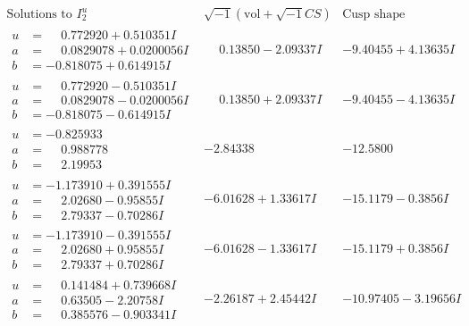 \documentclass[1p]{elsarticle_modified}
\theoremstyle{definition}
\newcommand{\I}{\sqrt{-1}}
\begin{document}
$$\begin{array}{c|c|c}  
\text{Solutions to }I^u_{2}& \I (\text{vol} + \sqrt{-1}CS) & \text{Cusp shape}\\
 \hline 
\begin{aligned}
u &= \phantom{-}0.772920 + 0.510351 I \\
a &= \phantom{-}0.0829078 + 0.0200056 I \\
b &= -0.818075 + 0.614915 I\end{aligned}
 & \phantom{-}0.13850 - 2.09337 I & -9.40455 + 4.13635 I \\ \hline\begin{aligned}
u &= \phantom{-}0.772920 - 0.510351 I \\
a &= \phantom{-}0.0829078 - 0.0200056 I \\
b &= -0.818075 - 0.614915 I\end{aligned}
 & \phantom{-}0.13850 + 2.09337 I & -9.40455 - 4.13635 I \\ \hline\begin{aligned}
u &= -0.825933\phantom{ +0.000000I} \\
a &= \phantom{-}0.988778\phantom{ +0.000000I} \\
b &= \phantom{-}2.19953\phantom{ +0.000000I}\end{aligned}
 & -2.84338\phantom{ +0.000000I} & -12.5800\phantom{ +0.000000I} \\ \hline\begin{aligned}
u &= -1.173910 + 0.391555 I \\
a &= \phantom{-}2.02680 - 0.95855 I \\
b &= \phantom{-}2.79337 - 0.70286 I\end{aligned}
 & -6.01628 + 1.33617 I & -15.1179 - 0.3856 I \\ \hline\begin{aligned}
u &= -1.173910 - 0.391555 I \\
a &= \phantom{-}2.02680 + 0.95855 I \\
b &= \phantom{-}2.79337 + 0.70286 I\end{aligned}
 & -6.01628 - 1.33617 I & -15.1179 + 0.3856 I \\ \hline\begin{aligned}
u &= \phantom{-}0.141484 + 0.739668 I \\
a &= \phantom{-}0.63505 - 2.20758 I \\
b &= \phantom{-}0.385576 - 0.903341 I\end{aligned}
 & -2.26187 + 2.45442 I & -10.97405 - 3.19656 I \\ \hline\begin{aligned}

\end{aligned}
\end{array}$$
\end{document}

